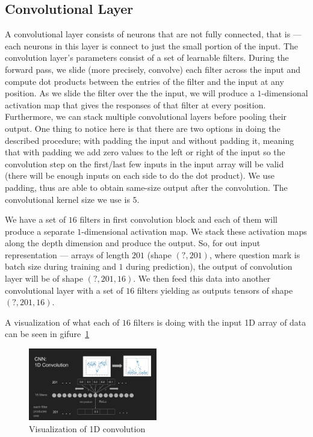 \documentclass[twoside]{article}
\begin{document}
\begin{multicols}{2}
\subsection{Convolutional Layer}
A convolutional layer consists of neurons that are not fully connected, that is --- each neurons in this layer is connect to just the small portion of the input. The convolution layer’s parameters consist of a set of learnable filters. During the forward pass, we slide (more precisely, convolve) each filter across the input and compute dot products between the entries of the filter and the input at any position. As we slide the filter over the the input, we will produce a $1$-dimensional activation map that gives the responses of that filter at every position. Furthermore, we can stack multiple convolutional layers before pooling their output. One thing to notice here is that there are two options in doing the described procedure; with padding the input and without padding it, meaning that with padding we add zero values to the left or right of the input so the convolution step on the first/last few inputs in the input array will be valid (there will be enough inputs on each side to do the dot product). We use padding, thus are able to obtain same-size output after the convolution. The convolutional kernel size we use is $5$.

We have a set of $16$ filters in first convolution block and each of them will produce a separate $1$-dimensional activation map. We stack these activation maps along the depth dimension and produce the output. So, for out input representation --- arrays of length $201$ (shape $(?,201)$, where question mark is batch size during training and $1$ during prediction), the output of convolution layer will be of shape $(?,201,16)$. We then feed this data into another convolutional layer with a set of $16$ filters yielding as outputs tensors of shape $(?,201,16)$.

A visualization of what each of $16$ filters is doing with the input 1D array of data can be seen in gifure~\ref{fig:1d_conv} 
\begin{figure}[H]
\includegraphics[width=0.5\textwidth]{1d_conv}
\caption{Visualization of 1D convolution}
\label{fig:1d_conv}
\end{figure}


\end{multicols}
\end{document}
